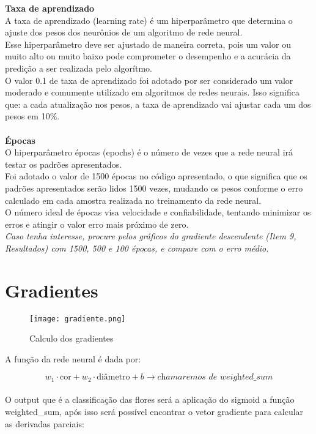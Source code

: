 \documentclass[12pt]{article}
\begin{document}
\textbf{Taxa de aprendizado}\\
A taxa de aprendizado (learning rate) é um hiperparâmetro que determina o ajuste dos pesos dos neurônios de um algoritmo de rede neural.\\
Esse hiperparâmetro deve ser ajustado de maneira correta, pois um valor ou muito alto ou muito baixo pode comprometer o desempenho e a acurácia da predição a ser realizada pelo algorítmo.\\
O valor 0.1 de taxa de aprendizado foi adotado por ser considerado um valor moderado e comumente utilizado em algoritmos de redes neurais. Isso significa que: a cada atualização nos pesos, a taxa de aprendizado vai ajustar cada um dos pesos em 10\%.\\
\\
\textbf{Épocas}\\
O hiperparâmetro épocas (epochs) é o número de vezes que a rede neural irá testar os padrões apresentados.\\
Foi adotado o valor de 1500 épocas no código apresentado, o que significa que os padrões apresentados serão lidos 1500 vezes, mudando os pesos conforme o erro calculado em cada amostra realizada no treinamento da rede neural.\\
O número ideal de épocas visa velocidade e confiabilidade, tentando minimizar os erros e atingir o valor erro mais próximo de zero.\\
\textit{Caso tenha interesse, procure pelos gráficos do gradiente descendente (Item 9, Resultados) com 1500, 500 e 100 épocas, e compare com o erro médio.}

\section{Gradientes}

\begin{figure}[H]
  \centering
  \texttt{[image: gradiente.png]}
  \caption{Calculo dos gradientes}
\end{figure}

A função da rede neural é dada por:

\begin{equation}
w_1 \cdot \text{cor} + w_2 \cdot \text{diâmetro} + b \rightarrow \textit{chamaremos de weighted\_sum}
\end{equation}\\
O output que é a classificação das flores será a aplicação do sigmoid a função weighted\_sum, após isso será possível encontrar o vetor gradiente para calcular as derivadas parciais: 
\end{document}
